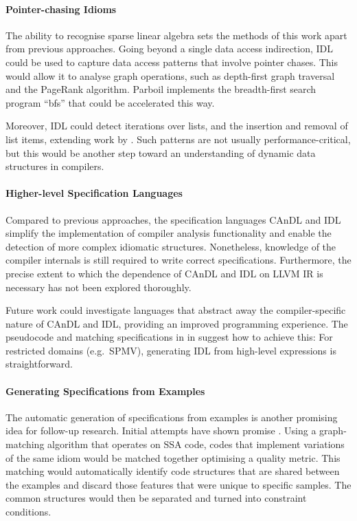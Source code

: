\paragraph*{Pointer-chasing Idioms}

    The ability to recognise sparse linear algebra sets the methods of this
    work apart from previous approaches.
    Going beyond a single data access indirection, IDL could be used to capture
    data access patterns that involve pointer chases.
    This would allow it to analyse graph operations, such as depth-first graph
    traversal and the PageRank algorithm.
    Parboil implements the breadth-first search program ``bfs'' that could be
    accelerated this way.

    Moreover, IDL could detect iterations over lists, and the insertion and
    removal of list items, extending work by
    \citet{Manilov:2018:GPI:3178372.3179511}.
    Such patterns are not usually performance-critical, but this would be
    another step toward an understanding of dynamic data structures in compilers.

    \paragraph*{Higher-level Specification Languages}
    Compared to previous approaches, the specification languages CAnDL and IDL
    simplify the implementation of compiler analysis functionality and enable
    the detection of more complex idiomatic structures.
    Nonetheless, knowledge of the compiler internals is still required to write
    correct specifications.
    Furthermore, the precise extent to which the dependence of CAnDL and IDL on
    LLVM IR is necessary has not been explored thoroughly.

    Future work could investigate languages that abstract away the
    compiler-specific nature of CAnDL and IDL, providing an improved programming
    experience.
    The pseudocode and matching specifications in
     in  suggest
    how to achieve this:
    For restricted domains (e.g.\ SPMV), generating IDL from high-level
    expressions is straightforward.

    \paragraph*{Generating Specifications from Examples}
    The automatic generation of specifications from examples is another
    promising idea for follow-up research.
    Initial attempts have shown promise \citep{DBLP:conf/IEEEpact/CollieGO19}.
    Using a graph-matching algorithm that operates on SSA code, codes that
    implement variations of the same idiom would be matched together optimising
    a quality metric.
    This matching would automatically identify code structures that are shared
    between the examples and discard those features that were unique to
    specific samples.
    The common structures would then be separated and turned into constraint
    conditions.


